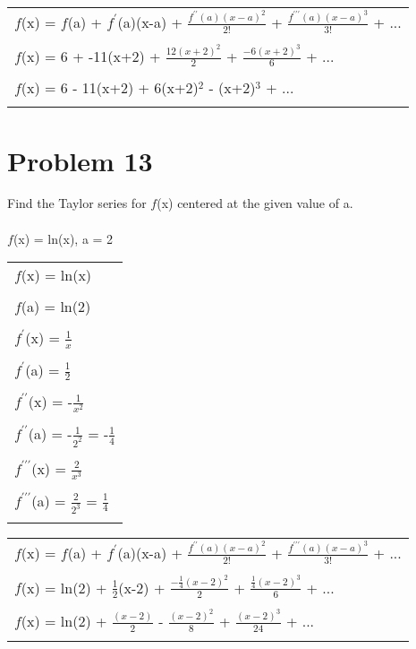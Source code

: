 \documentclass{article} %
\begin{document}
    \begin{tabular}{l}
        $f$(x) = $f$(a) + $f^{\prime}$(a)(x-a) + $\frac{f^{\prime\prime}(a)(x-a)^2}{2!}$ + $\frac{f^{\prime\prime\prime}(a)(x-a)^3}{3!}$ + ...\\\\
        $f$(x) = 6 + -11(x+2) + $\frac{12(x+2)^2}{2}$ + $\frac{-6(x+2)^3}{6}$ + ...\\\\
        $f$(x) = 6 - 11(x+2) + 6(x+2)$^2$ - (x+2)$^3$ + ...\\\\   
    \end{tabular}


    \section*{Problem 13} %
    Find the Taylor series for $f$(x) centered at the given value of a.\\\\
    $f$(x) = ln(x), a = 2\\

    \begin{tabular}{l}
        $f$(x) = ln(x)\\\\
        $f$(a) = ln(2)\\\\
        $f^{\prime}$(x) = $\frac{1}{x}$\\\\
        $f^{\prime}$(a) = $\frac{1}{2}$\\\\
        $f^{\prime\prime}$(x) = -$\frac{1}{x^2}$\\\\
        $f^{\prime\prime}$(a) = -$\frac{1}{2^2}$ = -$\frac{1}{4}$\\\\
        $f^{\prime\prime\prime}$(x) = $\frac{2}{x^3}$\\\\
        $f^{\prime\prime\prime}$(a) = $\frac{2}{2^3}$ = $\frac{1}{4}$\\\\  
    \end{tabular}
    
    \begin{tabular}{l}
        $f$(x) = $f$(a) + $f^{\prime}$(a)(x-a) + $\frac{f^{\prime\prime}(a)(x-a)^2}{2!}$ + $\frac{f^{\prime\prime\prime}(a)(x-a)^3}{3!}$ + ...\\\\
        $f$(x) = ln(2) + $\frac{1}{2}$(x-2) + $\frac{-\frac{1}{4}(x-2)^2}{2}$ + $\frac{\frac{1}{4}(x-2)^3}{6}$ + ...\\\\
        $f$(x) = ln(2) + $\frac{(x-2)}{2}$ - $\frac{(x-2)^2}{8}$ + $\frac{(x-2)^3}{24}$ + ...\\\\   
    \end{tabular}
\end{document}

